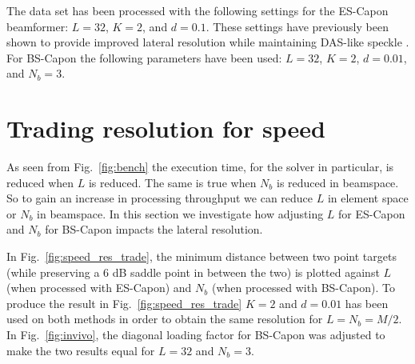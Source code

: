 \documentclass[journal]{IEEEtran}
\newcommand{\degree}{\ensuremath{^\circ}}
\begin{document}
The data set has been processed with the following settings for the ES-Capon beamformer: $L = 32$, $K = 2$, and $d=0.1$. These settings have previously been shown to provide improved lateral resolution while maintaining DAS-like speckle \cite{Synnevag2007a}. For BS-Capon the following parameters have been used: $L=32$, $K=2$, $d=0.01$, and $N_b=3$. 


\section{Trading resolution for speed}\label{sec:trade}
As seen from Fig.\ \ref{fig:bench} the execution time, for the solver in particular, is reduced when $L$ is reduced. The same is true when $N_b$ is reduced in beamspace. So to gain an  increase in processing throughput we can reduce $L$ in element space or $N_b$ in beamspace. In this section we investigate how adjusting $L$ for ES-Capon and $N_b$ for BS-Capon impacts the lateral resolution. 

In Fig.\ \ref{fig:speed_res_trade}, the minimum distance between two point targets (while preserving a 6 dB saddle point in between the two) is plotted against $L$ (when processed with ES-Capon) and $N_b$ (when processed with BS-Capon). To produce the result in Fig.\ \ref{fig:speed_res_trade} $K=2$ and $d=0.01$ has been used on both methods in order to obtain the same resolution for $L=N_b=M/2$. 
In Fig.\ \ref{fig:invivo}, the diagonal loading factor for BS-Capon was adjusted to make the two results equal for $L=32$ and $N_b=3$. %
\end{document}
